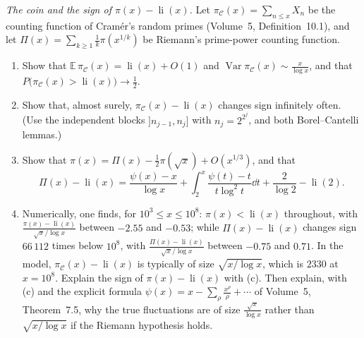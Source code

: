 \begin{exercise}[Journey]\label{pb:cramersign}
\emph{The coin and the sign of $\pi(x)-\operatorname{li}(x)$.} Let $\pi_{\mathcal C}(x)=\sum_{n\le x}X_n$ be the counting function of Cramér's random primes
(Volume~5, Definition~10.1), and let $\Pi(x)=\sum_{k\ge1}\frac1k\pi(x^{1/k})$ be Riemann's prime-power counting function.
\begin{enumerate}[label=(\alph*)]
\item Show that $\mathbb E\,\pi_{\mathcal C}(x)=\operatorname{li}(x)+O(1)$ and $\operatorname{Var}\pi_{\mathcal C}(x)\sim\frac x{\log x}$, and that
$P\bigl(\pi_{\mathcal C}(x)>\operatorname{li}(x)\bigr)\to\frac12$.
\item Show that, almost surely, $\pi_{\mathcal C}(x)-\operatorname{li}(x)$ changes sign infinitely often. (Use the independent blocks $]n_{j-1},n_j]$ with $n_j=2^{2^j}$, and
both Borel--Cantelli lemmas.)
\item Show that $\pi(x)=\Pi(x)-\frac12\pi(\sqrt x)+O(x^{1/3})$, and that
\[
\Pi(x)-\operatorname{li}(x)=\frac{\psi(x)-x}{\log x}+\int_2^x\frac{\psi(t)-t}{t\log^2t}\dd t+\frac2{\log2}-\operatorname{li}(2).
\]
\item Numerically, one finds, for $10^3\le x\le10^8$: $\pi(x)<\operatorname{li}(x)$ throughout, with $\frac{\pi(x)-\operatorname{li}(x)}{\sqrt x/\log x}$ between $-2.55$ and
$-0.53$; while $\Pi(x)-\operatorname{li}(x)$ changes sign $66\,112$ times below $10^8$, with $\frac{\Pi(x)-\operatorname{li}(x)}{\sqrt x/\log x}$ between $-0.75$ and $0.71$. In the
model, $\pi_{\mathcal C}(x)-\operatorname{li}(x)$ is typically of size $\sqrt{x/\log x}$, which is $2330$ at $x=10^8$. Explain the sign of $\pi(x)-\operatorname{li}(x)$
with (c). Then explain, with (c) and the explicit formula $\psi(x)=x-\sum_\rho\frac{x^\rho}\rho+\cdots$ of Volume~5, Theorem~7.5, why the true fluctuations are of
size $\frac{\sqrt x}{\log x}$ rather than $\sqrt{x/\log x}$ if the Riemann hypothesis holds.
\end{enumerate}
\end{exercise}

